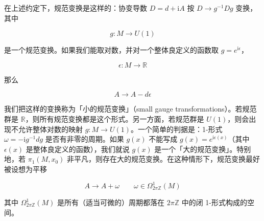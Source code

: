在上述约定下，规范变换是这样的：协变导数 $D=d+\mathrm{i}A$ 按 $D\to g^{-1}Dg$ 变换，其中

\begin{equation}
  g:M\to U(1)
  \tag{2.39}
  \label{eq:2.39}
\end{equation}

是一个规范变换。如果我们能取对数，并对一个整体良定义的函数取 $g=e^{\mathrm{i}\epsilon}$，

\begin{equation}
  \epsilon:M\to\mathbb{R}
  \tag{2.40}
  \label{eq:2.40}
\end{equation}

那么

\begin{equation}
  A\to A-d\epsilon
  \tag{2.41}
  \label{eq:2.41}
\end{equation}

我们把这样的变换称为「小的规范变换」（small gauge transformations）。若规范群是 $\mathbb{R}$，则所有规范变换都是这个形式。另一方面，若规范群是 $U(1)$，则会出现不允许整体对数的映射 $g:M\to U(1)$。一个简单的判据是：1-形式 $\omega=-\mathrm{i}g^{-1}dg$ 是否有非零的周期。如果 $g(x)$ 不能写成 $g(x)=e^{\mathrm{i}\epsilon(x)}$（其中 $\epsilon(x)$ 是整体良定义的函数），我们就说 $g(x)$ 是一个「大的规范变换」。特别地，若 $\pi_1(M,x_0)$ 非平凡，则存在大的规范变换。在这种情形下，规范变换最好被设想为平移

\begin{equation}
  A\to A+\omega
  \qquad \omega\in\Omega^{1}_{2\pi\mathbb{Z}}(M)
  \tag{2.42}
  \label{eq:2.42}
\end{equation}

其中 $\Omega^{1}_{2\pi\mathbb{Z}}(M)$ 是所有（适当可微的）周期都落在 $2\pi\mathbb{Z}$ 中的闭 1-形式构成的空间。


